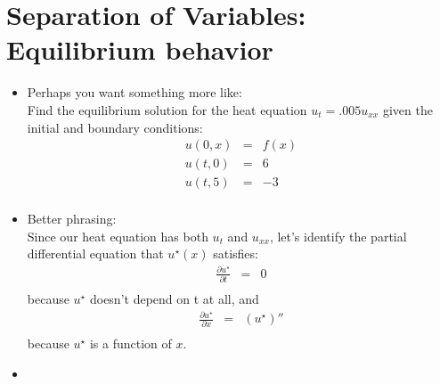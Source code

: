 \documentclass{article}
\def\ds{\displaystyle}
\newcommand{\bea}{\begin{eqnarray*}}
\newcommand{\eea}{\end{eqnarray*}}
\begin{document}
\section{Separation of Variables: Equilibrium behavior}
\begin{itemize}
\item Perhaps you want something more like: \\
Find the equilibrium solution for the heat equation $\ds u_t = .005 u_{xx}$ given the initial and boundary conditions:
\bea
u(0,x) &=& f(x) \\
u(t,0) &=& 6 \\
u(t,5) &=& -3 \\
\eea
\item Better phrasing: \\
Since our heat equation has both $u_t$ and $u_{xx}$, let's identify the partial differential equation that $u^{\star}(x)$ satisfies:
\bea
\frac{\partial u^{\star} }{\partial t} &=& 0 \\
\eea
because $u^{\star}$ doesn't depend on t at all, and 
\bea
\frac{\partial u^{\star} }{\partial x} &=& (u^{\star})'' \\
\eea
because $u^{\star}$ is a function of $x$.
\item
\end{itemize}
\end{document}
